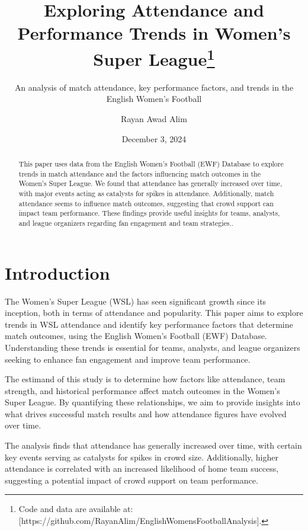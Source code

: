 \documentclass[
  letterpaper,
  DIV=11,
  numbers=noendperiod]{scrartcl}
\title{Exploring Attendance and Performance Trends in Women's Super
League\thanks{Code and data are available at:
{[}https://github.com/RayanAlim/EnglishWomensFootballAnalysis{]}.}}
\subtitle{An analysis of match attendance, key performance factors, and
trends in the English Women's Football}
\author{Rayan Awad Alim}
\date{December 3, 2024}
\begin{document}
\maketitle
\begin{abstract}
This paper uses data from the English Women's Football (EWF) Database to
explore trends in match attendance and the factors influencing match
outcomes in the Women's Super League. We found that attendance has
generally increased over time, with major events acting as catalysts for
spikes in attendance. Additionally, match attendance seems to influence
match outcomes, suggesting that crowd support can impact team
performance. These findings provide useful insights for teams, analysts,
and league organizers regarding fan engagement and team strategies..
\end{abstract}
\ifdefined\Shaded\renewenvironment{Shaded}{\begin{tcolorbox}[interior hidden, frame hidden, boxrule=0pt, borderline west={3pt}{0pt}{shadecolor}, enhanced, breakable, sharp corners]}{\end{tcolorbox}}\fi

\hypertarget{introduction}{%
\section{Introduction}\label{introduction}}

The Women's Super League (WSL) has seen significant growth since its
inception, both in terms of attendance and popularity. This paper aims
to explore trends in WSL attendance and identify key performance factors
that determine match outcomes, using the English Women's Football (EWF)
Database. Understanding these trends is essential for teams, analysts,
and league organizers seeking to enhance fan engagement and improve team
performance.

The estimand of this study is to determine how factors like attendance,
team strength, and historical performance affect match outcomes in the
Women's Super League. By quantifying these relationships, we aim to
provide insights into what drives successful match results and how
attendance figures have evolved over time.

The analysis finds that attendance has generally increased over time,
with certain key events serving as catalysts for spikes in crowd size.
Additionally, higher attendance is correlated with an increased
likelihood of home team success, suggesting a potential impact of crowd
support on team performance.
\end{document}
